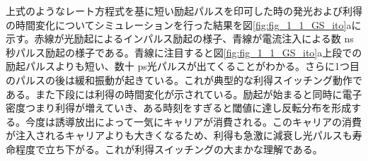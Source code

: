 上式のようなレート方程式を基に短い励起パルスを印可した時の発光および利得の時間変化についてシミュレーションを行った結果を図\ref{fig:fig_1_1_GS_ito}aに示す。赤線が光励起によるインパルス励起の様子、青線が電流注入による数 ns秒パルス励起の様子である。青線に注目すると図\ref{fig:fig_1_1_GS_ito}a上段での励起パルスよりも短い、数十 ps光パルスが出てくることがわかる。さらに1つ目のパルスの後は緩和振動が起きている。これが典型的な利得スイッチング動作である。また下段には利得の時間変化が示されている。励起が始まると同時に電子密度つまり利得が増えていき、ある時刻をすぎると閾値に達し反転分布を形成する。今度は誘導放出によって一気にキャリアが消費される。このキャリアの消費が注入されるキャリアよりも大きくなるため、利得も急激に減衰し光パルスも寿命程度で立ち下がる。これが利得スイッチングの大まかな理解である。

